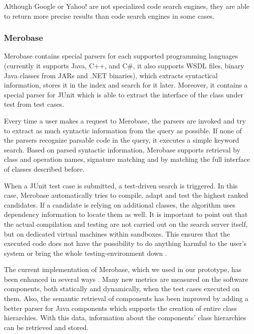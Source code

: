 Although Google or Yahoo! are not specialized code search engines, they are able to return more precise results than code search engines in some cases\cite{Hummel2007}.

\subsubsection{Merobase}
\label{subsec:merobase}

Merobase contains special parsers for each supported programming languages (currently it supports Java, C++, and C\#, it also supports WSDL files, binary Java classes from JARs and .NET binaries), which extracts syntactical information, stores it in the index and search for it later. Moreover, it contains a special parser for JUnit which is able to extract the interface of the class under test from test cases.

Every time a user makes a request to Merobase, the parsers are invoked and try to extract as much syntactic information from the query as possible. If none of the parsers recognize parsable code in the query, it executes a simple keyword search. Based on parsed syntactic information, Merobase supports retrieval by class and operation names, signature matching and by matching the full interface of classes described before.

When a JUnit test case is submitted, a test-driven search is triggered. In this case, Merobase automatically tries to compile, adapt and test the highest ranked candidates. If a candidate is relying on additional classes, the algorithm uses dependency information to locate them as well. It is important to point out that the actual compilation and testing are not carried out on the search server itself, but on dedicated virtual machines within sandboxes. This ensures that the executed code does not have the possibility to do anything harmful to the user's system or bring the whole testing-environment down \cite{Hummel2013}.

The current implementation of Merobase, which we used in our prototype, has been enhanced in several ways \cite{Kessel2016}. Many new metrics are measured on the software components, both statically and dynamically, when the test cases executed on them. Also, the semantic retrieval of components has been improved by adding a better parser for Java components which supports the creation of entire class hierarchies. With this data, information about the components' class hierarchies can be retrieved and stored.

